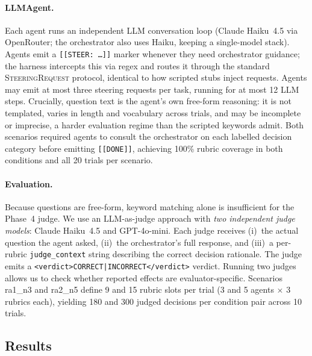 \documentclass{article}
\begin{document}
\paragraph{LLMAgent.}
Each agent runs an independent LLM conversation loop (Claude Haiku~4.5
via OpenRouter; the orchestrator also uses Haiku, keeping a single-model
stack).
Agents emit a \texttt{[[STEER:~\ldots]]} marker whenever they need
orchestrator guidance; the harness intercepts this via regex and routes it
through the standard \textsc{SteeringRequest} protocol, identical to how
scripted stubs inject requests.
Agents may emit at most three steering requests per task, running for at
most 12 LLM steps.
Crucially, question text is the agent's own free-form reasoning:
it is not templated, varies in length and vocabulary across trials, and
may be incomplete or imprecise, a harder evaluation regime than the
scripted keywords admit.
Both scenarios required agents to consult the orchestrator on each
labelled decision category before emitting \texttt{[[DONE]]}, achieving
100\% rubric coverage in both conditions and all 20 trials per scenario.

\paragraph{Evaluation.}
Because questions are free-form, keyword matching alone is insufficient
for the Phase~4 judge.
We use an LLM-as-judge approach with \emph{two independent judge models}:
Claude Haiku~4.5 and GPT-4o-mini.
Each judge receives (i)~the actual question the agent asked,
(ii)~the orchestrator's full response, and
(iii)~a per-rubric \texttt{judge\_context} string describing the correct
decision rationale.
The judge emits a \texttt{<verdict>CORRECT|INCORRECT</verdict>} verdict.
Running two judges allows us to check whether reported effects are
evaluator-specific.
Scenarios ra1\_n3 and ra2\_n5 define 9 and 15 rubric slots per trial
(3 and 5 agents $\times$ 3 rubrics each), yielding 180 and 300 judged
decisions per condition pair across 10 trials.

\subsection{Results}
\label{sec:results_p4}
\end{document}
